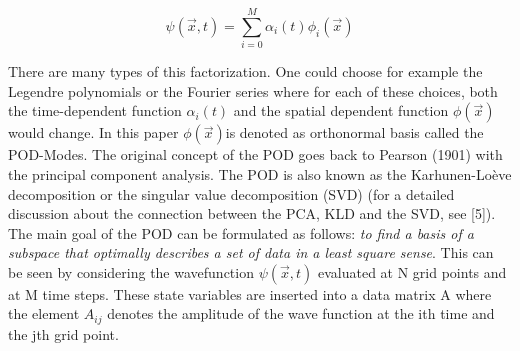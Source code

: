 \documentclass[usenatbib]{mn2e}
\begin{document}
\begin{equation}\label{eq8}
\psi( \overrightarrow {x},t) = \sum_{i=0}^M \alpha_i(t) \phi_i(\overrightarrow{x}) 
\end{equation} 

There are many types of this factorization. One could choose for example the Legendre polynomials or the Fourier series where for each of these choices, both the time-dependent function \(\alpha_i(t)\) and the spatial dependent function \(\phi(\overrightarrow{x})\) would change. In this paper \(\phi(\overrightarrow{x})\)is denoted as orthonormal basis called the POD-Modes. The original concept of the POD goes back to Pearson (1901) with the principal component analysis. The POD is also known as the Karhunen-Loève decomposition or the singular value decomposition (SVD) (for a detailed discussion about the connection between the PCA, KLD and the SVD, see [5]). The main goal of the POD can be formulated as follows: \textit{to find a basis of a subspace that optimally describes a set of data in a least square sense}. 
This can be seen by considering the wavefunction  \(\psi( \overrightarrow {x},t)\) evaluated at N grid points and at M time steps. These state variables are inserted into a data matrix A where the element \(A_{ij}\) denotes the amplitude of the wave function at the ith time and the jth grid point.



\def\aap{A\&A}
\def\araa{ARA\&A}
\def\apjl{APJL}
\def\mnras{MNRAS}
\def\nat{Nature}


\end{document}
